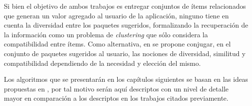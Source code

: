 Si bien el objetivo de ambos trabajos es entregar conjuntos de ítems relacionados que generan un valor agregado al usuario de la aplicación, ninguno tiene en cuenta la diversidad entre los paquetes sugeridos, formalizando la recuperación de la información como un problema de {\em clustering} que sólo considera la compatibilidad entre ítems. Como alternativa, en \cite{journals/tkde/Amer-YahiaBCFMZ14} se propone conjugar, en el conjunto de paquetes sugeridos al usuario, las nociones de diversidad, similitud y compatibilidad dependiendo de la necesidad y elección del mismo.

Los algoritmos que se presentarán en los capítulos siguientes se basan en las ideas propuestas en \cite{journals/tkde/Amer-YahiaBCFMZ14}, por tal motivo serán aquí descriptos con un nivel de detalle mayor en comparación a los descriptos en los trabajos citados previamente.

